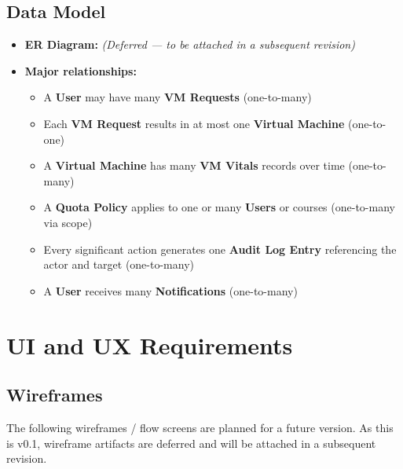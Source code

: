 \documentclass[12pt,letterpaper]{article}
\begin{document}
\subsection{Data Model}

\begin{itemize}
  \item \textbf{ER Diagram:} \textit{(Deferred --- to be attached in a subsequent revision)}
  \item \textbf{Major relationships:}
    \begin{itemize}
      \item A \textbf{User} may have many \textbf{VM Requests} (one-to-many)
      \item Each \textbf{VM Request} results in at most one \textbf{Virtual Machine} (one-to-one)
      \item A \textbf{Virtual Machine} has many \textbf{VM Vitals} records over time (one-to-many)
      \item A \textbf{Quota Policy} applies to one or many \textbf{Users} or courses (one-to-many via scope)
      \item Every significant action generates one \textbf{Audit Log Entry} referencing the actor and target (one-to-many)
      \item A \textbf{User} receives many \textbf{Notifications} (one-to-many)
    \end{itemize}
\end{itemize}

\section{UI and UX Requirements}

\subsection{Wireframes}

The following wireframes / flow screens are planned for a future version. As this is v0.1, wireframe artifacts are deferred and will be attached in a subsequent revision.
\end{document}
